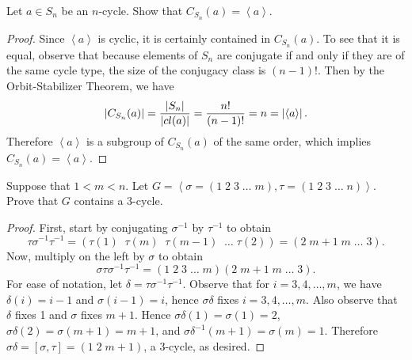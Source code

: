 \documentclass[10pt]{amsart}
\begin{document}
\begin{ex4}
  Let $a \in S_n$ be an $n$-cycle.  Show that $C_{S_n}(a) = \left< a \right>$.
  \begin{proof}
    Since $\left< a \right>$ is cyclic, it is certainly contained in $C_{S_n}(a)$.
    To see that it is equal, observe that because elements of $S_n$ are conjugate if and only if they are of the same cycle type, the size of the conjugacy class is $(n-1)!$.
    Then by the Orbit-Stabilizer Theorem, we have $$\left| C_{S_n}(a) \right| = \frac{\left| S_n \right|}{\left| cl(a) \right|} = \frac{n!}{(n-1)!} = n = \left| \left<a\right> \right|.$$
    Therefore $\left<a\right>$ is a subgroup of $C_{S_n}(a)$ of the same order, which implies $C_{S_n}(a) = \left< a \right>$.
  \end{proof}
\end{ex4}

\begin{ex5}
  Suppose that $1 < m < n$.  Let $G = \left<\sigma = (1\; 2\; 3\; \ldots\; m), \tau = (1\; 2\; 3\; \ldots\; n)\right>$.
  Prove that $G$ contains a 3-cycle.
  \begin{proof}
    First, start by conjugating $\sigma^{-1}$ by $\tau^{-1}$ to obtain
    $$\tau\sigma^{-1}\tau^{-1} = (\tau(1)\;\; \tau(m)\;\; \tau(m-1)\;\; \ldots\; \tau(2)) =(2\; m+1\; m\; \ldots\; 3).$$
    Now, multiply on the left by $\sigma$ to obtain
    $$\sigma\tau\sigma^{-1}\tau^{-1} = (1\; 2\; 3\; \ldots\; m)(2\; m+1\; m\; \ldots\; 3).$$%
    For ease of notation, let $\delta = \tau\sigma^{-1}\tau^{-1}$.
    Observe that for $i = 3, 4, \ldots, m$, we have $\delta(i) = i-1$ and $\sigma(i-1) = i$, hence $\sigma\delta$ fixes $i = 3, 4, \ldots, m$.
	Also observe that $\delta$ fixes 1 and $\sigma$ fixes $m+1$.
    Hence $\sigma\delta(1) = \sigma(1) = 2$, $\sigma\delta(2) = \sigma(m+1) = m+1$, and $\sigma\delta^{-1}(m+1) = \sigma(m) = 1$.
    Therefore $\sigma\delta = [\sigma,\tau] = (1\; 2\; m+1)$, a 3-cycle, as desired.
  \end{proof}
\end{ex5}
\end{document}
